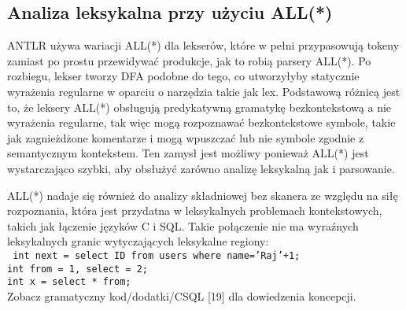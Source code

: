 \subsection{Analiza leksykalna przy użyciu ALL(*)}
ANTLR używa wariacji ALL(*) dla lekserów, które w pełni przypasowują tokeny
zamiast po prostu przewidywać produkcje, jak to robią parsery ALL(*).
Po rozbiegu, lekser tworzy DFA podobne do tego, co utworzyłyby statycznie
wyrażenia regularne w oparciu o narzędzia takie jak lex.
Podstawową różnicą jest to, że leksery ALL(*) obsługują predykatywną gramatykę
bezkontekstową a nie wyrażenia regularne, tak więc mogą rozpoznawać
bezkontekstowe symbole, takie jak zagnieżdżone komentarze i mogą wpuszczać
lub nie symbole zgodnie z semantycznym kontekstem. 
Ten zamysł jest możliwy ponieważ ALL(*) jest wystarczająco szybki, aby
obsłużyć zarówno analizę leksykalną jak i parsowanie.
\par
ALL(*) nadaje się również do analizy składniowej bez skanera ze względu na
siłę rozpoznania, która jest przydatna w leksykalnych problemach kontekstowych,
takich jak łączenie języków C i SQL.
Takie połączenie nie ma wyraźnych leksykalnych granic wytyczających leksykalne regiony: \\
 \texttt{
int next = select ID from users where name='Raj'+1; \\
int from = 1, select = 2; \\
int x = select * from; \\
}
Zobacz gramatyczny kod/dodatki/CSQL [19] dla dowiedzenia koncepcji. 
